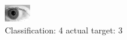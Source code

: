 \begin{figure}[h!]
\begin{center}
\includegraphics[width=0.60\columnwidth]{figures/ID253_class_4_target_3.png}
\end{center}
\caption{ Classification: 4 actual target: 3}
\label{fig:ID253_class_4_target_3}
\end{figure}
